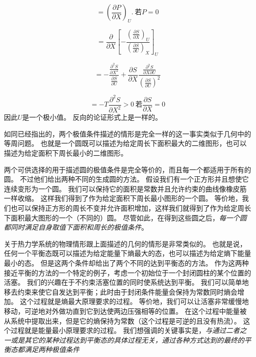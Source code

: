 \begin{equation}
\label{equ5.4}
=\left(\frac{\partial P}{\partial X}\right)_U.~\text{若}P=0
\end{equation}

\begin{equation}
\label{equ5.5}
=\frac{\partial}{\partial X}
\left[-\frac{\left(\frac{\partial S}{\partial X}\right)_U}{\left(\frac{\partial S}{\partial U}\right)_X}\right]_U
\end{equation}

\begin{equation}
\label{equ5.6}
=-\frac{\frac{\partial^2S}{\partial X^2}}
{\frac{\partial S}{\partial U}}+\frac{\partial S}{\partial X}
\frac{\frac{\partial^2S}{\partial X\partial U}}{\left(\frac{\partial S}{\partial U}\right)^2}
\end{equation}

\begin{equation}
\label{equ5.7}
=-T\frac{\partial^2S}{\partial X^2}>0
~\text{若}\frac{\partial S}{\partial X}=0
\end{equation}
因此$U$是一个极小值。
反向的论证形式上是一样的。

如同已经指出的，两个极值条件描述的情形是完全一样的这一事实类似于几何中的等周问题。
也就是一个圆既可以描述为给定周长下面积最大的二维图形，也可以描述为给定面积下周长最小的二维图形。


两个可供选择的用于描述圆的极值条件是完全等价的，而且每一个都适用于所有的圆。
不过他们给出两种不同的生成圆的方法。
假设我们有一个正方形并且想使它连续变形为一个圆。
我们可以保持它的面积是常数并且允许约束的曲线像橡皮筋一样收缩。
这样我们得到了作为给定面积下周长最小图形的一个圆。
等价地，我们也可以保持正方形的周长不变并允许面积增加，这样我们就得到了作为给定周长下面积最大图形的一个（不同的）圆。
尽管如此，在得到这些圆之后，{\it 每一个圆都同时满足自身取值下面积和周长的极值条件}。

关于热力学系统的物理情形跟上面描述的几何的情形是非常类似的。
也就是说，任何一个平衡态既可以描述为给定能量下熵最大的态，也可以描述为给定熵下能量最小的态。
但是这两个条件却给出了两个不同的达到平衡态的方法。
作为这两种接近平衡的方法的一个特定的例子，考虑一个初始位于一个封闭圆柱的某个位置的活塞。
我们的兴趣在于不约束活塞位置的同时使系统达到平衡。
我们可以简单地移去约束来使它自发达到平衡；此时由于封闭条件能量会保持为常数同时熵会增加。
这个过程就是熵最大原理要求的过程。
等价地，我们可以让活塞非常缓慢地移动，可逆地对外做功直到它到达使两边压强相等的位置。
在这个过程中能量被从系统中提取出来，但是它的熵保持为常数（这个过程是可逆的且没有热流）。
这个过程就是能量最小原理要求的过程。
我们想强调的关键事实是，{\it 与通过二者之一或是其它的某种过程达到平衡态的具体过程无关，通过各种方式达到的最终的平衡态都满足两种极值条件}

